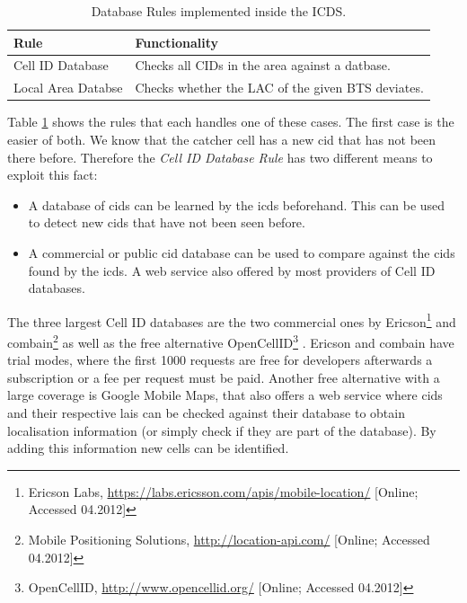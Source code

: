 \begin{table}
\centering
\begin{tabular}{ll}
\toprule
Rule					&Functionality\\
\midrule
Cell ID Database		&Checks all CIDs in the area against a datbase.\\
Local Area Databse 		&Checks whether the LAC of the given BTS deviates.\\
\bottomrule
\end{tabular}
\caption{Database Rules implemented inside the ICDS.}
\label{tab:database_rules}
\end{table}

Table \ref{tab:database_rules} shows the rules that each handles one of these cases.
The first case is the easier of both.
We know that the catcher cell has a new \gls{cid} that has not been there before.
Therefore the \emph{Cell ID Database Rule} has two different means to exploit this fact:
\begin{itemize}
	\item A database of \glspl{cid} can be learned by the \gls{icds} beforehand. 
	This can be used to detect new \glspl{cid} that have not been seen before.
	\item A commercial or public \gls{cid} database can be used to compare against the \glspl{cid} found by the \gls{icds}.
	A web service also offered by most providers of Cell ID databases.
\end{itemize}
The three largest Cell ID databases are the two commercial ones by Ericson\footnote{Ericson Labs, \url{https://labs.ericsson.com/apis/mobile-location/} [Online; Accessed 04.2012]} and combain\footnote{Mobile Positioning Solutions, \url{http://location-api.com/} [Online; Accessed 04.2012]} as well as the free alternative OpenCellID\footnote{OpenCellID, \url{http://www.opencellid.org/} [Online; Accessed 04.2012]} \cite{wiki_cells}.
Ericson and combain have trial modes, where the first 1000 requests are free for developers afterwards a subscription or a fee per request must be paid.
Another free alternative with a large coverage is Google Mobile Maps, that also offers a web service where \glspl{cid} and their respective \glspl{lai} can be checked against their database to obtain localisation information (or simply check if they are part of the database).
By adding this information new cells can be identified.

